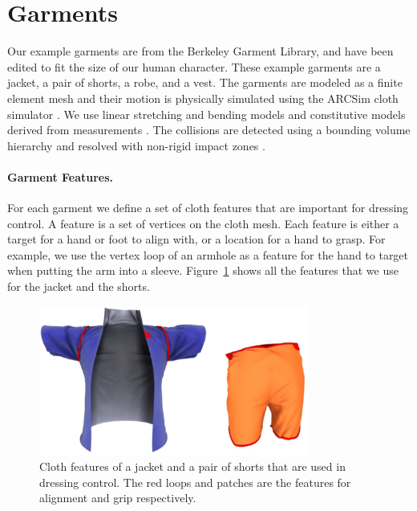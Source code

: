 \section{Garments}


Our example garments are from the Berkeley Garment Library, and have been
edited to fit the size of our human character.  These example garments
are a jacket, a pair of shorts, a robe, and a vest.
The garments are modeled as a finite element mesh and their motion is
physically simulated
using the ARCSim cloth simulator \cite{Narain:2012:AAR}. We use linear
stretching and bending models and constitutive models derived from
measurements \cite{Wang:2011}. The collisions are detected using a
bounding volume hierarchy \cite{Tang:2010} and resolved with non-rigid
impact zones \cite{Harmon:2008}.

\paragraph{Garment Features.} For each garment we define a set of cloth
features that are important for dressing control. A feature is a set of
vertices on the cloth mesh.  Each feature is either a target for a hand or
foot to align with, or a location for a hand to grasp.  For example, we
use the vertex loop of an armhole as a feature for the hand to target when
putting the arm into a sleeve.  Figure~\ref{fig:features} shows all the
features that we use for the jacket and the shorts.

\begin{figure}[!t]
  \centering
  \includegraphics[width=3.5in]{images/features}
  \caption{Cloth features of a jacket and a pair of shorts that are used in dressing control. The red loops and patches are the features for alignment and grip respectively.}
  \label{fig:features}
\end{figure}

